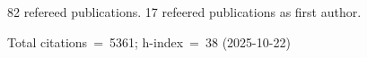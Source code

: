 82 refereed publications. 17 refeered publications as first author.

Total citations~=~5361; h-index~=~38 (2025-10-22)